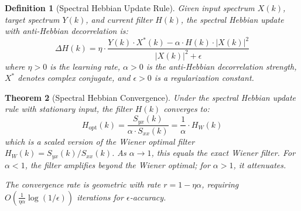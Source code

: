 \documentclass[11pt]{article}
\newtheorem{theorem}{Theorem}
\newtheorem{definition}[theorem]{Definition}
\begin{document}
\begin{definition}[Spectral Hebbian Update Rule]
Given input spectrum $X(k)$, target spectrum $Y(k)$, and current filter
$H(k)$, the spectral Hebbian update with anti-Hebbian decorrelation is:
\begin{equation}
\Delta H(k) = \eta \cdot \frac{Y(k) \cdot X^*(k) - \alpha \cdot H(k) \cdot |X(k)|^2}{|X(k)|^2 + \epsilon}
\end{equation}
where $\eta > 0$ is the learning rate, $\alpha > 0$ is the anti-Hebbian
decorrelation strength, $X^*$ denotes complex conjugate, and $\epsilon > 0$
is a regularization constant.
\end{definition}

\begin{theorem}[Spectral Hebbian Convergence]
\label{thm:hebbian}
Under the spectral Hebbian update rule with stationary input,
the filter $H(k)$ converges to:
\begin{equation}
H_{\text{opt}}(k) = \frac{S_{yx}(k)}{\alpha \cdot S_{xx}(k)}
= \frac{1}{\alpha} \cdot H_W(k)
\end{equation}
which is a scaled version of the Wiener optimal filter
$H_W(k) = S_{yx}(k) / S_{xx}(k)$.
As $\alpha \to 1$, this equals the exact Wiener filter.
For $\alpha < 1$, the filter amplifies beyond the Wiener optimal;
for $\alpha > 1$, it attenuates.

The convergence rate is geometric with rate $r = 1 - \eta\alpha$,
requiring $O(\frac{1}{\eta\alpha} \log(1/\epsilon))$ iterations
for $\epsilon$-accuracy.
\end{theorem}
\end{document}
